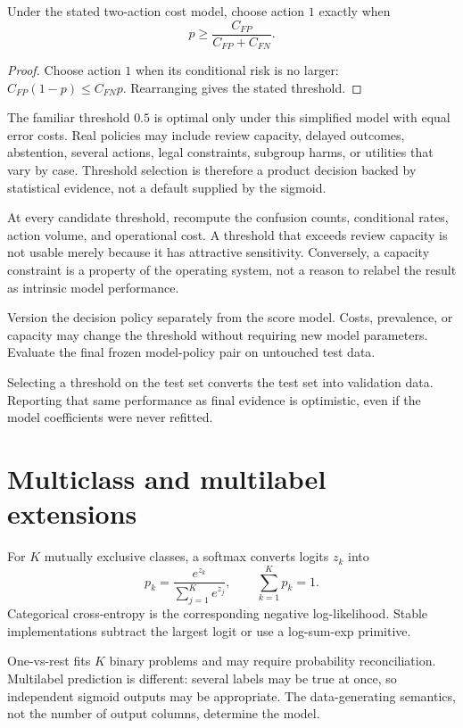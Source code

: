 \begin{proposition}
Under the stated two-action cost model, choose action $1$ exactly when
\[
p\ge \frac{C_{FP}}{C_{FP}+C_{FN}}.
\]
\end{proposition}

\begin{proof}
Choose action $1$ when its conditional risk is no larger:
$C_{FP}(1-p)\le C_{FN}p$. Rearranging gives the stated threshold.
\end{proof}

The familiar threshold $0.5$ is optimal only under this simplified model with
equal error costs. Real policies may include review capacity, delayed outcomes,
abstention, several actions, legal constraints, subgroup harms, or utilities
that vary by case. Threshold selection is therefore a product decision backed
by statistical evidence, not a default supplied by the sigmoid.

At every candidate threshold, recompute the confusion counts, conditional rates,
action volume, and operational cost. A threshold that exceeds review capacity is
not usable merely because it has attractive sensitivity. Conversely, a capacity
constraint is a property of the operating system, not a reason to relabel the
result as intrinsic model performance.

Version the decision policy separately from the score model. Costs, prevalence,
or capacity may change the threshold without requiring new model parameters.
Evaluate the final frozen model-policy pair on untouched test data.

\begin{warningbox}
Selecting a threshold on the test set converts the test set into validation
data. Reporting that same performance as final evidence is optimistic, even if
the model coefficients were never refitted.
\end{warningbox}

\section{Multiclass and multilabel extensions}

For $K$ mutually exclusive classes, a softmax converts logits $z_k$ into
\[
p_k=\frac{e^{z_k}}{\sum_{j=1}^K e^{z_j}},
\qquad
\sum_{k=1}^K p_k=1.
\]
Categorical cross-entropy is the corresponding negative log-likelihood. Stable
implementations subtract the largest logit or use a log-sum-exp primitive.

One-vs-rest fits $K$ binary problems and may require probability reconciliation.
Multilabel prediction is different: several labels may be true at once, so
independent sigmoid outputs may be appropriate. The data-generating semantics,
not the number of output columns, determine the model.


